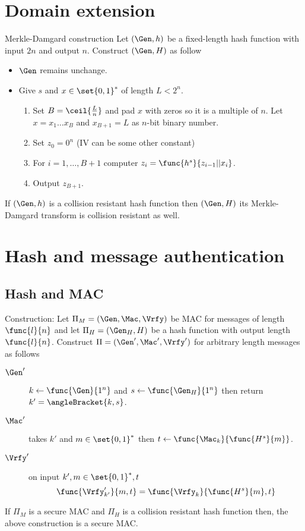 \section{Domain extension}
Merkle-Damgard construction 
Let \((\Gen,h)\) be a fixed-length hash function with input \(2n\) and output \(n\). Construct \((\Gen,H)\) as follow 
\begin{itemize}
    \item \(\Gen\) remains unchange.
    \item Give \(s\) and \(x \in \set{0,1}^{\ast}\) of length \(L < 2^n\). 
    \begin{enumerate}
        \item Set \(B = \ceil{\frac{L}{n}}\) and pad \(x\) with zeros so it is a multiple of \(n\). Let \(x = x_1\dots x_B\) and \(x_{B+1} = L\) as \(n\)-bit binary number. 
        \item Set \(z_0 = 0^n\) (IV can be some other constant)
        \item For \(i = 1, \dots, B+1\) computer \(z_i = \func{h^s}{z_{i-1}||x_i}\).
        \item Output \(z_{B+1}\). 
    \end{enumerate}
\end{itemize}

\begin{theorem}
    If \((\Gen,h)\) is a collision resistant hash function then \((\Gen,H)\) its Merkle-Damgard transform is collision resistant as well.
\end{theorem}
\section{Hash and message authentication}
\subsection{Hash and MAC}
Construction: 
Let \(\Pi_M = (\Gen,\Mac,\Vrfy)\) be MAC for messages of length \(\func{l}{n}\) and let \(\Pi_H = (\Gen_H,H)\) be a hash function with output length \(\func{l}{n}\). Construct \(\Pi = (\Gen',\Mac',\Vrfy')\) for arbitrary length messages as follows 
\begin{description}
    \item [\(\Gen'\)] \(k \gets \func{\Gen}{1^n}\) and \(s \gets \func{\Gen_H}{1^n}\) then return \(k' = \angleBracket{k,s}\).
    \item [\(\Mac'\)] takes \(k'\) and \(m \in \set{0,1}^{\ast}\) then \(t \gets \func{\Mac_{k}}{\func{H^s}{m}}\).
    \item [\(\Vrfy'\)] on input \(k',m \in \set{0,1}^{\ast},t\) 
    \begin{equation*}
        \func{\Vrfy'_{k'}}{m,t} = \func{\Vrfy_k}{\func{H^s}{m},t}
    \end{equation*}
\end{description}
\begin{theorem}
    If \(\Pi_M\) is a secure MAC and \(\Pi_H\) is a collision resistant hash function then, the above construction is a secure MAC.
\end{theorem}

